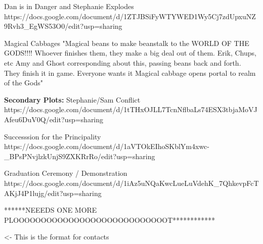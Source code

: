 \documentclass[char]{GL2020}
\begin{document}
Dan is in Danger and Stephanie Explodes
https://docs.google.com/document/d/1ZTJBSiFyWTYWED1Wy5Cj7zdUpxuNZ9Rvh3_EgWS53O0/edit?usp=sharing

Magical Cabbages
"Magical beans to make beanstalk to the WORLD OF THE GODS!!!!
Whoever finishes them, they make a big deal out of them.  
Erik, Chups, etc
Amy and Ghost corresponding about this, passing beans back and forth.  They finish it in game.  Everyone wants it
Magical cabbage opens portal to realm of the Gods"


\textbf{Secondary Plots:}
Stephanie/Sam Conflict
https://docs.google.com/document/d/1tTHxOJLL7TcnNflbaLs74ESX3tbjaMoVJAfeu6DuV0Q/edit?usp=sharing

Successsion for the Principality
https://docs.google.com/document/d/1aVTOkEIhoSKblYm4xwc-_BPsPNvjlzkUnjS9ZXKRrRo/edit?usp=sharing

Graduation Ceremony / Demonstration
https://docs.google.com/document/d/1iAz5uNQaKwcLueLuVdehK_7QhkevpFcTAKjJ4P1lujg/edit?usp=sharing

******NEEEDS ONE MORE PLOOOOOOOOOOOOOOOOOOOOOOOOOOOOT************

\begin{itemz}[Goals]
	\item 
\end{itemz}

\begin{itemz}[Notes]
	\item 
\end{itemz}

\begin{contacts}
	\contact{\cTest{}} <- This is the format for contacts 
\end{contacts}
\end{document}
